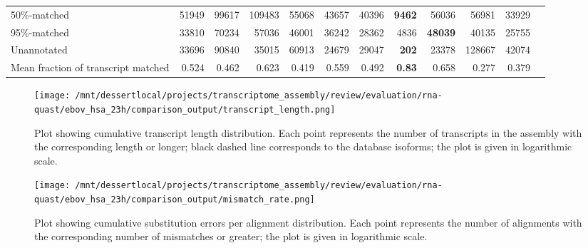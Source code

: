 \documentclass[12pt,a4paper]{article}
\begin{document}
\begin{table}[t]
\begin{adjustbox}{width=1\textwidth}
\begin{tabular}{|l*{11}{|r}|}
50\%-matched                                            & 51949                  & 99617                  & 109483                 & 55068                  & 43657                  & 40396                  & \textbf{9462}          & 56036                  & 56981                  & 33929                  \\
95\%-matched                                            & 33810                  & 70234                  & 57036                  & 46001                  & 36242                  & 28362                  & 4836                   & \textbf{48039}         & 40135                  & 25755                  \\
Unannotated                                             & 33696                  & 90840                  & 35015                  & 60913                  & 24679                  & 29047                  & \textbf{202}           & 23378                  & 128667                 & 42074                  \\
Mean fraction of transcript matched                     & 0.524                  & 0.462                  & 0.623                  & 0.419                  & 0.559                  & 0.492                  & \textbf{0.83}          & 0.658                  & 0.277                  & 0.379                  \\ \hline
\end{tabular}
\end{adjustbox}
\end{table}

\FloatBarrier
\clearpage
{}

\begin{figure}[t]
\centering
\texttt{[image: /mnt/dessertlocal/projects/transcriptome\_assembly/review/evaluation/rna-quast/ebov\_hsa\_23h/comparison\_output/transcript\_length.png]}
\caption{Plot showing cumulative transcript length distribution. Each point represents the number of transcripts in the assembly with the corresponding length or longer; black dashed line corresponds to the database isoforms; the plot is given in logarithmic scale.}
\end{figure}
\FloatBarrier
\clearpage


\begin{figure}[t]
\centering
\texttt{[image: /mnt/dessertlocal/projects/transcriptome\_assembly/review/evaluation/rna-quast/ebov\_hsa\_23h/comparison\_output/mismatch\_rate.png]}
\caption{Plot showing cumulative substitution errors per alignment distribution. Each point represents the number of alignments with the corresponding number of mismatches or greater; the plot is given in logarithmic scale.}
\end{figure}
\FloatBarrier
\clearpage
\end{document}
